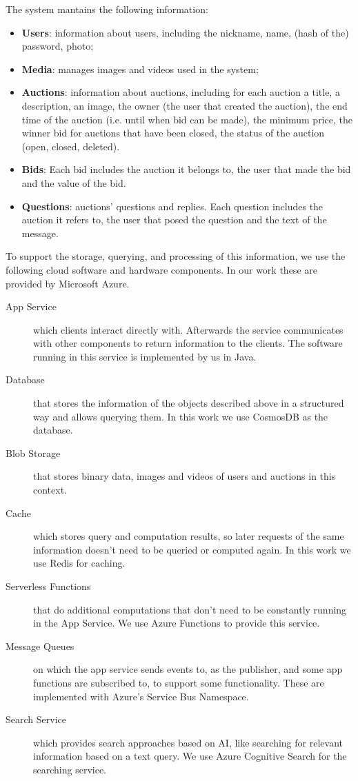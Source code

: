 \documentclass[runningheads]{llncs}
\begin{document}
The system mantains the following information:
\begin{itemize}
    \item \textbf{Users}: information about users, including the nickname, name, (hash of the) password, photo;
    \item \textbf{Media}: manages images and videos used in the system;
    \item \textbf{Auctions}: information about auctions, including for each auction a title, a description, an image, the owner (the user that created the auction), the end time of the auction (i.e. until when bid can be made), the minimum price, the winner bid for auctions that have been closed, the status of the auction (open, closed, deleted).
    \item \textbf{Bids}: Each bid includes the auction it belongs to, the user that made the bid and the value of the bid.
    \item \textbf{Questions}: auctions' questions and replies. Each question includes the auction it refers to, the user that posed the question and the text of the message. 
\end{itemize}

To support the storage, querying, and processing of this information, we use the following cloud software and hardware components. In our work these are provided by Microsoft Azure.

\begin{description}
    \item[App Service] which clients interact directly with. Afterwards the service communicates with other components to return information to the clients. The software running in this service is implemented by us in Java.
    \item[Database] that stores the information of the objects described above in a structured way and allows querying them. In this work we use CosmosDB as the database.
    \item[Blob Storage] that stores binary data, images and videos of users and auctions in this context.
    \item[Cache] which stores query and computation results, so later requests of the same information doesn't need to be queried or computed again. In this work we use Redis for caching.
    \item[Serverless Functions] that do additional computations that don't need to be constantly running in the App Service. We use Azure Functions to provide this service.
    \item[Message Queues] on which the app service sends events to, as the publisher, and some app functions are subscribed to, to support some functionality. These are implemented with Azure's Service Bus Namespace.
    \item[Search Service] which provides search approaches based on AI, like searching for relevant information based on a text query. We use Azure Cognitive Search for the searching service.
\end{description}
\end{document}
